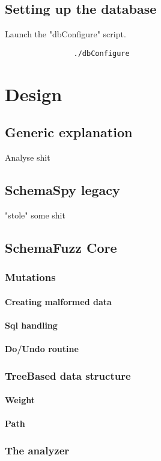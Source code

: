 \documentclass{article}
\begin{document}
		\subsection{Setting up the database}	
	
Launch the "dbConfigure" script.
			\begin{verbatim}
				./dbConfigure
			\end{verbatim}		 
		
	\section{Design}
		\subsection{Generic explanation}
			Analyse shit
		\subsection{SchemaSpy legacy}
			"stole" some shit
		\subsection{SchemaFuzz Core}
			\subsubsection{Mutations}
				\paragraph{Creating malformed data}
				\paragraph{Sql handling}
				\paragraph{Do/Undo routine}
			\subsubsection{TreeBased data structure}
				\paragraph{Weight}
				\paragraph{Path}
			\subsubsection{The analyzer}
\end{document}

